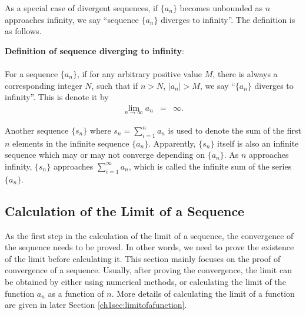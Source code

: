 As a special case of divergent sequences, if $\{a_n\}$ becomes unbounded as $n$ approaches infinity, we say ``sequence $\{a_n\}$ diverges to infinity''. The definition is as follows.
\begin{VF}
\textbf{Definition of sequence diverging to infinity}:
\\
\\
\noindent For a sequence $\{a_n\}$, if for any arbitrary positive value $M$, there is always a corresponding integer $N$, such that if $n>N$, $|a_n|>M$, we say ``$\{a_n\}$ diverges to infinity''. This is denote it by
\begin{eqnarray}
  \lim_{n\rightarrow \infty}a_n &=& \infty. \nonumber
\end{eqnarray}
\end{VF}

Another sequence $\{s_n\}$ where $s_n=\sum_{i=1}^{n}a_n$ is used to denote the sum of the first $n$ elements in the infinite sequence $\{a_n\}$. Apparently, $\{s_n\}$ itself is also an infinite sequence which may or may not converge depending on $\{a_n\}$. As $n$ approaches infinity, $\{s_n\}$ approaches $\sum_{i=1}^{\infty} a_n$, which is called the infinite sum of the series $\{a_n\}$.

\subsection{Calculation of the Limit of a Sequence} \label{chisubsec:proofofsequenceconvergence}

As the first step in the calculation of the limit of a sequence, the convergence of the sequence needs to be proved. In other words, we need to prove the existence of the limit before calculating it. This section mainly focuses on the proof of convergence of a sequence. Usually, after proving the convergence, the limit can be obtained by either using numerical methods, or calculating the limit of the function $a_n$ as a function of $n$. More details of calculating the limit of a function are given in later Section \ref{ch1sec:limitofafunction}.


